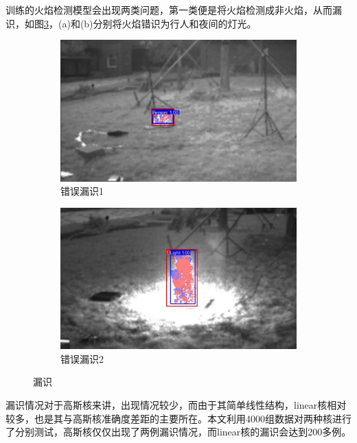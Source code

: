 训练的火焰检测模型会出现两类问题，第一类便是将火焰检测成非火焰，从而漏识，如图\ref{21}，(a)和(b)分别将火焰错识为行人和夜间的灯光。
\begin{figure}[ht]
    \centering
    \begin{subfigure}{0.49\textwidth}
        \centering
        \includegraphics[width=\textwidth]{figures/jiance3.png}
        \caption{错误漏识1}
        \label{21.a}
    \end{subfigure}
    \hfill
    \begin{subfigure}{0.49\textwidth}
        \centering
        \includegraphics[width=\textwidth]{figures/jiance7.png}
        \caption{错误漏识2}
        \label{21.b}
    \end{subfigure}
    \caption{漏识}
    \label{21}
\end{figure}

漏识情况对于高斯核来讲，出现情况较少，而由于其简单线性结构，linear核相对较多，也是其与高斯核准确度差距的主要所在。本文利用4000组数据对两种核进行了分别测试，高斯核仅仅出现了两例漏识情况，而linear核的漏识会达到200多例。

